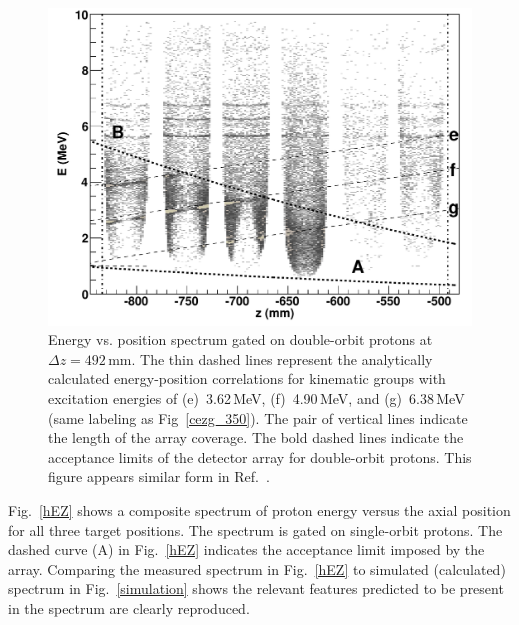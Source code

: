 \begin{figure}[ht]
\includegraphics[width=\columnwidth]{Figures/cDouble_bw}%
\caption[Energy vs. position spectrum gated on double-orbit protons  at $\Delta z=492$\,mm]{Energy vs. position spectrum gated on double-orbit protons at $\Delta z=492$\,mm.   The thin dashed lines represent the analytically calculated energy-position
correlations for kinematic groups with excitation energies of (e)~3.62\,MeV,
(f)~4.90\,MeV, and (g)~6.38\,MeV (same labeling as Fig~\ref{cezg_350}).  The pair of vertical lines indicate the length of the array coverage.  The bold dashed lines indicate the acceptance limits of the detector array for double-orbit protons.  This figure appears similar form in Ref.~\cite{Lighthall_2010}.}%
\label{double}%
\end{figure}

Fig.~\ref{hEZ} shows a composite spectrum of proton energy versus the axial position for all three target positions.  The spectrum is gated on single-orbit protons.  The dashed curve (A) in Fig.~\ref{hEZ} indicates the acceptance limit imposed by the array. %
Comparing the measured spectrum in Fig.~\ref{hEZ} to simulated (calculated) spectrum in Fig.~\ref{simulation} shows the relevant features predicted to be present in the spectrum are clearly reproduced.


